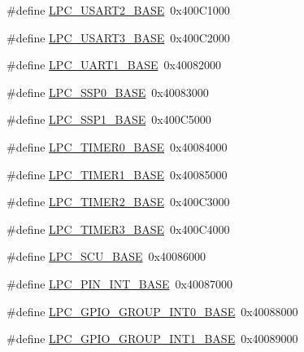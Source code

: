 \begin{DoxyCompactItemize}
\item 
\#define \hyperlink{group___p_e_r_i_p_h__43_x_x___b_a_s_e_gac377e7801bf13eb388b8f2cbdc61091f}{L\+P\+C\+\_\+\+U\+S\+A\+R\+T2\+\_\+\+B\+A\+SE}~0x400\+C1000
\item 
\#define \hyperlink{group___p_e_r_i_p_h__43_x_x___b_a_s_e_gabe7b830995c08b4b9ecd941f14c2a593}{L\+P\+C\+\_\+\+U\+S\+A\+R\+T3\+\_\+\+B\+A\+SE}~0x400\+C2000
\item 
\#define \hyperlink{group___p_e_r_i_p_h__43_x_x___b_a_s_e_ga18e8f96b25e3f343bdd7ba552ae7a617}{L\+P\+C\+\_\+\+U\+A\+R\+T1\+\_\+\+B\+A\+SE}~0x40082000
\item 
\#define \hyperlink{group___p_e_r_i_p_h__43_x_x___b_a_s_e_ga53fb1af80b541545988f2a966681abfd}{L\+P\+C\+\_\+\+S\+S\+P0\+\_\+\+B\+A\+SE}~0x40083000
\item 
\#define \hyperlink{group___p_e_r_i_p_h__43_x_x___b_a_s_e_ga05d118997f53f596d3a087f8b91a1969}{L\+P\+C\+\_\+\+S\+S\+P1\+\_\+\+B\+A\+SE}~0x400\+C5000
\item 
\#define \hyperlink{group___p_e_r_i_p_h__43_x_x___b_a_s_e_ga58d2cc2a6a4bd9319853ad5b62a20d43}{L\+P\+C\+\_\+\+T\+I\+M\+E\+R0\+\_\+\+B\+A\+SE}~0x40084000
\item 
\#define \hyperlink{group___p_e_r_i_p_h__43_x_x___b_a_s_e_ga077e94a95d95d79f6aeb0ea962377c46}{L\+P\+C\+\_\+\+T\+I\+M\+E\+R1\+\_\+\+B\+A\+SE}~0x40085000
\item 
\#define \hyperlink{group___p_e_r_i_p_h__43_x_x___b_a_s_e_gab46122134a159b494e060ae3a7be0967}{L\+P\+C\+\_\+\+T\+I\+M\+E\+R2\+\_\+\+B\+A\+SE}~0x400\+C3000
\item 
\#define \hyperlink{group___p_e_r_i_p_h__43_x_x___b_a_s_e_ga002e95d51eef32473052ea2575440eac}{L\+P\+C\+\_\+\+T\+I\+M\+E\+R3\+\_\+\+B\+A\+SE}~0x400\+C4000
\item 
\#define \hyperlink{group___p_e_r_i_p_h__43_x_x___b_a_s_e_gacd777eafbfcbc5701c9728c9261b1bd1}{L\+P\+C\+\_\+\+S\+C\+U\+\_\+\+B\+A\+SE}~0x40086000
\item 
\#define \hyperlink{group___p_e_r_i_p_h__43_x_x___b_a_s_e_ga4941871b3be823925361fe29e1d7721f}{L\+P\+C\+\_\+\+P\+I\+N\+\_\+\+I\+N\+T\+\_\+\+B\+A\+SE}~0x40087000
\item 
\#define \hyperlink{group___p_e_r_i_p_h__43_x_x___b_a_s_e_ga4bb8560e4125ff2b4dca337887316977}{L\+P\+C\+\_\+\+G\+P\+I\+O\+\_\+\+G\+R\+O\+U\+P\+\_\+\+I\+N\+T0\+\_\+\+B\+A\+SE}~0x40088000
\item 
\#define \hyperlink{group___p_e_r_i_p_h__43_x_x___b_a_s_e_ga198273b5c9e2dd57ffc28571c509f346}{L\+P\+C\+\_\+\+G\+P\+I\+O\+\_\+\+G\+R\+O\+U\+P\+\_\+\+I\+N\+T1\+\_\+\+B\+A\+SE}~0x40089000

\end{DoxyCompactItemize}
